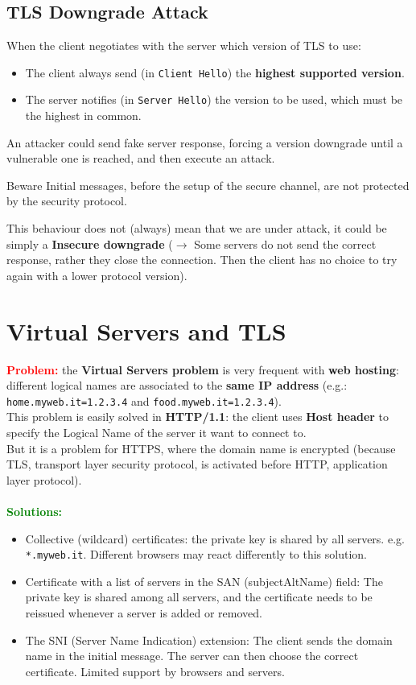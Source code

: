 \subsection{TLS Downgrade Attack}
When the client negotiates with the server which version of TLS to use: 
\begin{itemize}
    \item The client always send (in \texttt{Client Hello}) the \textbf{highest supported version}.
    \item The server notifies (in \texttt{Server Hello}) the version to be used, which must be the highest in common.
\end{itemize}
An attacker could send fake server response, forcing a version downgrade until a vulnerable one is reached, and then execute an attack. 
\begin{quotebox-red}{Beware}
Initial messages, before the setup of the secure channel, are not protected by the security protocol. 
\end{quotebox-red}
\noindent
This behaviour does not (always) mean that we are under attack, it could be simply a \textbf{Insecure downgrade} (\(\rightarrow\) Some servers do not send the correct response, rather they close the connection. Then the client has no choice to try again with a lower protocol version).

\section{Virtual Servers and TLS}
\textcolor{red}{\textbf{Problem:}} the \textbf{Virtual Servers problem} is very frequent with \textbf{web hosting}: different logical names are associated to the \textbf{same IP address} (e.g.: \texttt{home.myweb.it=1.2.3.4} and \texttt{food.myweb.it=1.2.3.4}).\\
This problem is easily solved in \textbf{HTTP/1.1}: the client uses \textbf{Host header} to specify the Logical Name of the server it want to connect to. \\
But it is a problem for HTTPS, where the domain name is encrypted (because
TLS, transport layer security protocol, is activated before HTTP, application layer protocol).\\
\\
\textcolor{green}{\textbf{Solutions:}}
\begin{itemize}
    \item Collective (wildcard) certificates: the private key is shared by all servers. e.g. \texttt{*.myweb.it}.
    Different browsers may react differently to this solution.
    \item Certificate with a list of servers in the SAN (subjectAltName) field: The private key is
    shared among all servers, and the certificate needs to be reissued whenever a server is
    added or removed.
    \item The SNI (Server Name Indication) extension: The client sends the domain name in the
    initial message. The server can then choose the correct certificate. Limited support by browsers and servers.
\end{itemize}
